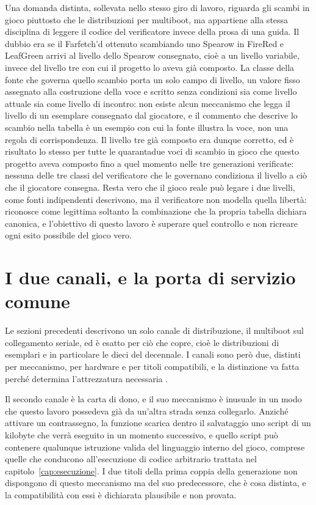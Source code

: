Una domanda distinta, sollevata nello stesso giro di lavoro, riguarda gli scambi in gioco piuttosto che le distribuzioni per multiboot, ma appartiene alla stessa disciplina di leggere il codice del verificatore invece della prosa di una guida. Il dubbio era se il Farfetch'd ottenuto scambiando uno Spearow in FireRed e LeafGreen arrivi al livello dello Spearow consegnato, cioè a un livello variabile, invece del livello tre con cui il progetto lo aveva già composto. La classe della fonte che governa quello scambio porta un solo campo di livello, un valore fisso assegnato alla costruzione della voce e scritto senza condizioni sia come livello attuale sia come livello di incontro: non esiste alcun meccanismo che legga il livello di un esemplare consegnato dal giocatore, e il commento che descrive lo scambio nella tabella è un esempio con cui la fonte illustra la voce, non una regola di corrispondenza. Il livello tre già composto era dunque corretto, ed è risultato lo stesso per tutte le quarantadue voci di scambio in gioco che questo progetto aveva composto fino a quel momento nelle tre generazioni verificate: nessuna delle tre classi del verificatore che le governano condiziona il livello a ciò che il giocatore consegna. Resta vero che il gioco reale può legare i due livelli, come fonti indipendenti descrivono, ma il verificatore non modella quella libertà: riconosce come legittima soltanto la combinazione che la propria tabella dichiara canonica, e l'obiettivo di questo lavoro è superare quel controllo e non ricreare ogni esito possibile del gioco vero.

\section{I due canali, e la porta di servizio comune}

Le sezioni precedenti descrivono un solo canale di distribuzione, il multiboot sul collegamento seriale, ed è esatto per ciò che copre, cioè le distribuzioni di esemplari e in particolare le dieci del decennale. I canali sono però due, distinti per meccanismo, per hardware e per titoli compatibili, e la distinzione va fatta perché determina l'attrezzatura necessaria \cite{gen-iii-event-patcher}.

Il secondo canale è la carta di dono, e il suo meccanismo è inusuale in un modo che questo lavoro possedeva già da un'altra strada senza collegarlo. Anziché attivare un contrassegno, la funzione scarica dentro il salvataggio uno script di un kilobyte che verrà eseguito in un momento successivo, e quello script può contenere qualunque istruzione valida del linguaggio interno del gioco, comprese quelle che conducono all'esecuzione di codice arbitrario trattata nel capitolo~\ref{cap:esecuzione}. I due titoli della prima coppia della generazione non dispongono di questo meccanismo ma del suo predecessore, che è cosa distinta, e la compatibilità con essi è dichiarata plausibile e non provata.

